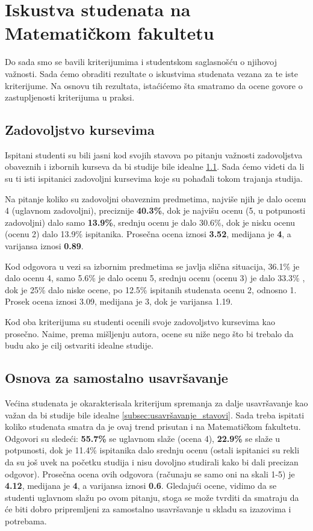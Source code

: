 \documentclass[a4paper]{article}
\begin{document}
{\section{Iskustva studenata na Matematičkom fakultetu}
\label{sec:iskustva}

Do sada smo se bavili kriterijumima i studentskom saglasnošću o njihovoj važnosti. Sada ćemo obraditi rezultate o iskustvima studenata vezana za te iste kriterijume. Na osnovu tih rezultata, istaćićemo šta smatramo da ocene govore o zastupljenosti kriterijuma u praksi.  

\subsection{Zadovoljstvo kursevima}
\label{subsec:zadovoljstvo_iskustva}
Ispitani studenti su bili jasni kod svojih stavova po pitanju važnosti zadovoljstva obaveznih i izbornih kurseva da bi studije bile idealne \ref{subsec:zadovoljstvo_iskustva}. Sada ćemo videti da li su ti isti ispitanici zadovoljni kursevima koje su pohađali tokom trajanja studija.

Na pitanje koliko su zadovoljni obaveznim predmetima, najviše njih je dalo ocenu 4 (uglavnom zadovoljni), preciznije \textbf{40.3\%}, dok je najvišu ocenu (5, u potpunosti zadovoljni) dalo samo \textbf{13.9\%}, srednju ocenu je dalo 30.6\%, dok je nisku ocenu (ocenu 2) dalo 13.9\% ispitanika. Prosečna ocena iznosi \textbf{3.52}, medijana je \textbf{4}, a varijansa iznosi  \textbf{0.89}.

Kod odgovora u vezi sa izbornim predmetima se javlja slična situacija, 36.1\% je dalo ocenu 4, samo 5.6\% je dalo ocenu 5, srednju ocenu (ocenu 3) je dalo 33.3\% , dok je 25\% dalo niske ocene, po 12.5\% ispitanih studenata ocenu 2, odnosno 1. Prosek ocena iznosi 3.09, medijana je 3, dok je varijansa 1.19. 

Kod oba kriterijuma su studenti ocenili svoje zadovoljstvo kursevima kao prosečno. Naime, prema mišljenju autora, ocene su niže nego što bi trebalo da budu ako je cilj ostvariti idealne studije.

\subsection{Osnova za samostalno usavršavanje}
\label{subsec:usavršavanje_iskustva}
Većina studenata je okarakterisala kriterijum spremanja za dalje usavršavanje kao važan da bi studije bile idealne \ref{subsec:usavršavanje_stavovi}. Sada treba ispitati koliko studenata smatra da je ovaj trend prisutan i na Matematičkom fakultetu.
Odgovori su sledeći: \textbf{55.7\%} se uglavnom slaže (ocena 4), \textbf{22.9\%} se slaže u potpunosti, dok je 11.4\% ispitanika dalo srednju ocenu (ostali ispitanici su rekli da su još uvek na početku studija i nisu dovoljno studirali kako bi dali precizan odgovor). Prosečna ocena ovih odgovora (računaju se samo oni na skali 1-5) je \textbf{4.12}, medijana je \textbf{4}, a varijansa iznosi \textbf{0.6}. Gledajući ocene, vidimo da se studenti uglavnom slažu po ovom pitanju, stoga se može tvrditi da smatraju da će biti dobro pripremljeni za samostalno usavršavanje u skladu sa izazovima i potrebama.


}
\end{document}
